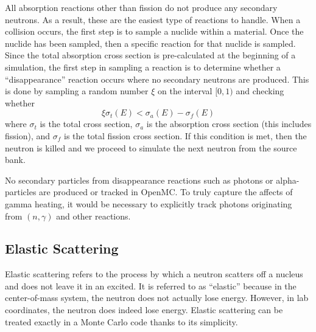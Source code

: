 All absorption reactions other than fission do not produce any secondary
neutrons. As a result, these are the easiest type of reactions to handle. When a
collision occurs, the first step is to sample a nuclide within a material. Once
the nuclide has been sampled, then a specific reaction for that nuclide is
sampled. Since the total absorption cross section is pre-calculated at the
beginning of a simulation, the first step in sampling a reaction is to determine
whether a ``disappearance'' reaction occurs where no secondary neutrons are
produced. This is done by sampling a random number $\xi$ on the interval $[0,1)$
  and checking whether
\begin{equation}
  \label{eq:disappearance}
  \xi \sigma_t (E) < \sigma_a (E) - \sigma_f (E)
\end{equation}
where $\sigma_t$ is the total cross section, $\sigma_a$ is the absorption cross
section (this includes fission), and $\sigma_f$ is the total fission cross
section. If this condition is met, then the neutron is killed and we proceed to
simulate the next neutron from the source bank.

No secondary particles from disappearance reactions such as photons or
alpha-particles are produced or tracked in OpenMC. To truly capture the affects
of gamma heating, it would be necessary to explicitly track photons originating
from $(n,\gamma)$ and other reactions.

\subsection{Elastic Scattering}

Elastic scattering refers to the process by which a neutron scatters off a
nucleus and does not leave it in an excited. It is referred to as ``elastic''
because in the center-of-mass system, the neutron does not actually lose
energy. However, in lab coordinates, the neutron does indeed lose
energy. Elastic scattering can be treated exactly in a Monte Carlo code thanks
to its simplicity.

